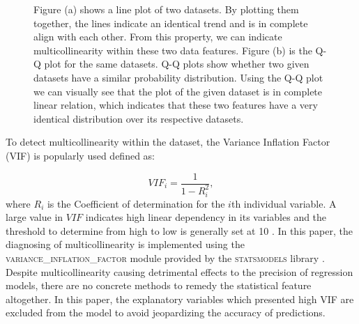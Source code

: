 \begin{figure}[!ht]
    \centering
    \qquad
    \caption{Figure (a) shows a line plot of two datasets. By plotting them together, the lines indicate an identical trend and is in complete align with each other. From this property, we can indicate multicollinearity within these two data features. Figure (b) is the Q-Q plot for the same datasets. Q-Q plots show whether two given datasets have a similar probability distribution. Using the Q-Q plot we can visually see that the plot of the given dataset is in complete linear relation, which indicates that these two features have a very identical distribution over its respective datasets.}
    \label{fig:multicollinearity}
\end{figure}

To detect multicollinearity within the dataset, the Variance Inflation Factor (VIF) is popularly used defined as:

\begin{equation}\label{eq:VIF}
    VIF_{i}=\frac{1}{1-R_{i}^{2}} ,
\end{equation}
where $R_{i}$ is the Coefficient of determination for the $i$th individual variable. A large value in $VIF$ indicates high linear dependency in its variables and the threshold to determine from high to low is generally set at 10 \citep{multicollinearity_VIF}. In this paper, the diagnosing of multicollinearity is implemented using the \textsc{variance\_inflation\_factor} module provided by the \textsc{statsmodels} library \citep{statsmodels_VIF}.
Despite multicollinearity causing detrimental effects to the precision of regression models, there are no concrete methods to remedy the statistical feature altogether. In this paper, the explanatory variables which presented high VIF are excluded from the model to avoid jeopardizing the accuracy of predictions. 

